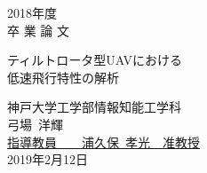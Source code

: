 \newcommand{\hdate}[1]{\setcounter{page}{0}\begin{center}{\LARGE
#1\\}\vskip 20pt {\Huge 卒 業 論 文}\end{center}\vskip 40pt}

\newcommand{\htitle}[1]{
        \begin{center}
                \vskip 16pt
                {\LARGE #1}\\
                \setlength{\unitlength}{1mm}
        \end{center}
        \vskip 40pt
}

\begin{titlepage}
\vspace*{2cm}
\hdate{2018年度}
\htitle{ティルトロータ型UAVにおける\\低速飛行特性の解析}

\hspace{8cm}
\begin{center}
\Large
神戸大学工学部情報知能工学科\\
\vskip 20pt
弓場~洋輝\\
\vskip 40pt
\underline{指導教員~~~~{\Large 浦久保~孝光~~准教授}}\\
\vskip 20pt
2019年2月12日
\end{center}
\end{titlepage}
